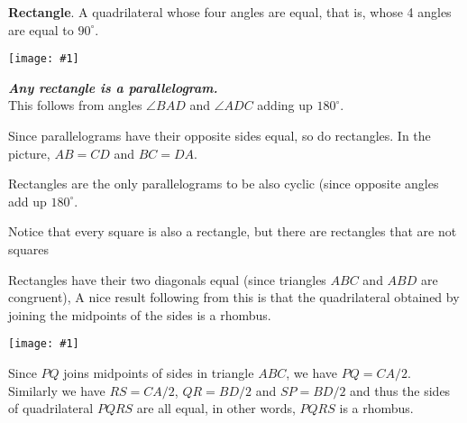 \documentclass{article}
\newcommand{\figura}[1]{\begin{center}\texttt{[image: \#1]}\end{center}}
\begin{document}
\textbf{Rectangle}.
A quadrilateral whose four angles are equal, that is, whose 4 angles are equal to $90^\circ$.

\figura{rectangulo}


\emph{\bf Any rectangle is a parallelogram.}\\
This follows from angles $\angle BAD $ and $\angle ADC$ adding up $180^\circ$.

Since parallelograms have their opposite sides equal, so do rectangles. In the picture, $AB=CD$ and $BC=DA$.

Rectangles are the only parallelograms to be also cyclic (since opposite angles add up $180^\circ$.

Notice that every square is also a rectangle, but there are rectangles that are not squares

Rectangles have their two diagonals equal (since triangles $ABC$ and $ABD$ are congruent), A nice result following from this is that the quadrilateral obtained by joining the midpoints of the sides is a rhombus.

\figura{rectangulo2}

Since $PQ$ joins midpoints of sides in triangle $ABC$, we have $PQ=CA/2$. Similarly we have $RS=CA/2$, $QR=BD/2$ and $SP=BD/2$ and thus the sides of quadrilateral $PQRS$ are all equal, in other words, $PQRS$ is a rhombus.
\end{document}
